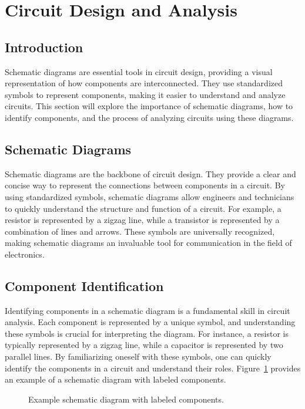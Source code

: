 \section{Circuit Design and Analysis}
\label{section:circuit_design_and_analysis}

\subsection*{Introduction}
Schematic diagrams are essential tools in circuit design, providing a visual representation of how components are interconnected. They use standardized symbols to represent components, making it easier to understand and analyze circuits. This section will explore the importance of schematic diagrams, how to identify components, and the process of analyzing circuits using these diagrams.

\subsection*{Schematic Diagrams}
Schematic diagrams are the backbone of circuit design. They provide a clear and concise way to represent the connections between components in a circuit. By using standardized symbols, schematic diagrams allow engineers and technicians to quickly understand the structure and function of a circuit. For example, a resistor is represented by a zigzag line, while a transistor is represented by a combination of lines and arrows. These symbols are universally recognized, making schematic diagrams an invaluable tool for communication in the field of electronics.

\subsection*{Component Identification}
Identifying components in a schematic diagram is a fundamental skill in circuit analysis. Each component is represented by a unique symbol, and understanding these symbols is crucial for interpreting the diagram. For instance, a resistor is typically represented by a zigzag line, while a capacitor is represented by two parallel lines. By familiarizing oneself with these symbols, one can quickly identify the components in a circuit and understand their roles. Figure~\ref{fig:schematic_example} provides an example of a schematic diagram with labeled components.

\begin{figure}[h!]
    \centering
    \caption{Example schematic diagram with labeled components.}
    \label{fig:schematic_example}
\end{figure}

